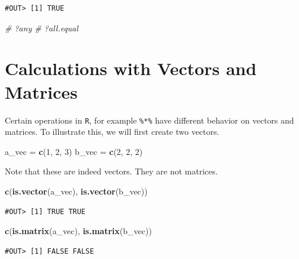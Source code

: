 \documentclass[]{book}
\newenvironment{Shaded}{\begin{snugshade}}{\end{snugshade}}
\newcommand{\KeywordTok}[1]{\textcolor[rgb]{0.13,0.29,0.53}{\textbf{#1}}}
\newcommand{\DecValTok}[1]{\textcolor[rgb]{0.00,0.00,0.81}{#1}}
\newcommand{\StringTok}[1]{\textcolor[rgb]{0.31,0.60,0.02}{#1}}
\newcommand{\CommentTok}[1]{\textcolor[rgb]{0.56,0.35,0.01}{\textit{#1}}}
\newcommand{\NormalTok}[1]{#1}
\theoremstyle{definition}
\theoremstyle{definition}
\theoremstyle{definition}
\theoremstyle{remark}
\begin{document}
\begin{verbatim}
#OUT> [1] TRUE
\end{verbatim}

\begin{Shaded}
\begin{Highlighting}[]
\CommentTok{# ?any}
\CommentTok{# ?all.equal}
\end{Highlighting}
\end{Shaded}

\section{Calculations with Vectors and
Matrices}\label{calculations-with-vectors-and-matrices}

Certain operations in \texttt{R}, for example \texttt{\%*\%} have
different behavior on vectors and matrices. To illustrate this, we will
first create two vectors.

\begin{Shaded}
\begin{Highlighting}[]
\NormalTok{a_vec =}\StringTok{ }\KeywordTok{c}\NormalTok{(}\DecValTok{1}\NormalTok{, }\DecValTok{2}\NormalTok{, }\DecValTok{3}\NormalTok{)}
\NormalTok{b_vec =}\StringTok{ }\KeywordTok{c}\NormalTok{(}\DecValTok{2}\NormalTok{, }\DecValTok{2}\NormalTok{, }\DecValTok{2}\NormalTok{)}
\end{Highlighting}
\end{Shaded}

Note that these are indeed vectors. They are not matrices.

\begin{Shaded}
\begin{Highlighting}[]
\KeywordTok{c}\NormalTok{(}\KeywordTok{is.vector}\NormalTok{(a_vec), }\KeywordTok{is.vector}\NormalTok{(b_vec))}
\end{Highlighting}
\end{Shaded}

\begin{verbatim}
#OUT> [1] TRUE TRUE
\end{verbatim}

\begin{Shaded}
\begin{Highlighting}[]
\KeywordTok{c}\NormalTok{(}\KeywordTok{is.matrix}\NormalTok{(a_vec), }\KeywordTok{is.matrix}\NormalTok{(b_vec))}
\end{Highlighting}
\end{Shaded}

\begin{verbatim}
#OUT> [1] FALSE FALSE
\end{verbatim}
\end{document}
